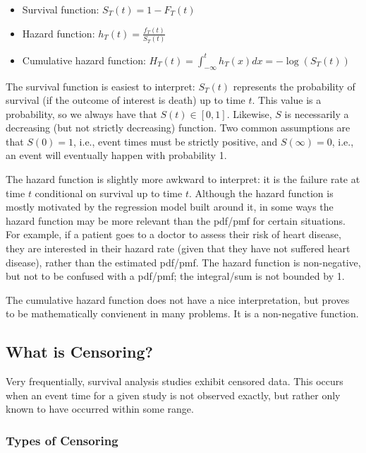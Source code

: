\documentclass[a4paper]{article}
\begin{document}
  \begin{itemize}
  \item Survival function: $S_T(t) = 1 - F_T(t)$
  \item Hazard function: $h_T(t) = \frac{f_T(t)}{S_T(t)}$
  \item Cumulative hazard function: 
      $H_T(t) = \displaystyle \int_{-\infty}^{t} h_T(x) dx
      =
      -\log(S_T(t))$
  \end{itemize}

  The survival function is easiest to interpret: $S_T(t)$ represents the probability of survival (if the outcome of interest is death) up to time $t$. This value is a probability, so we always have that $S(t) \in [0,1]$. Likewise, $S$ is necessarily a decreasing (but not strictly decreasing) function. Two common assumptions are that $S(0) = 1$, i.e., event times must be strictly positive, and $S(\infty) = 0$, i.e., an event will eventually happen with probability 1. 

  
  The hazard function is slightly more awkward to interpret: it is the failure rate at time $t$ conditional on survival up to time $t$. Although the hazard function is mostly motivated by the regression model built around it, in some ways the hazard function may be more relevant than the pdf/pmf for certain situations. For example, if a patient goes to a doctor to assess their risk of heart disease, they are interested in their hazard rate (given that they have not suffered heart disease), rather than the estimated pdf/pmf. The hazard function is non-negative, but not to be confused with a pdf/pmf; the integral/sum is not bounded by 1. 
  
  The cumulative hazard function does not have a nice interpretation, but proves to be mathematically convienent in many problems. It is a non-negative function. 


\subsection{What is Censoring?}

  Very frequentially, survival analysis studies exhibit censored data. This occurs when an event time for a given study is not observed exactly, but rather only known to have occurred within some range. 
  
  \subsubsection{Types of Censoring}
\end{document}
